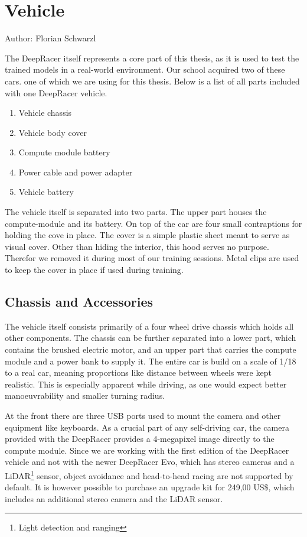 \chapter{Vehicle}
Author: Florian Schwarzl

The DeepRacer itself represents a core part of this thesis, as it is used to test the trained models in a real-world environment. Our school acquired two of these cars. one of which we are using for this thesis. Below is a list of all parts included with one DeepRacer vehicle.

\begin{enumerate}
    \item Vehicle chassis
    \item Vehicle body cover
    \item Compute module battery
    \item Power cable and power adapter
    \item Vehicle battery
\end{enumerate}

The vehicle itself is separated into two parts. The upper part houses the compute-module and its battery. On top of the car are four small contraptions for holding the cove in place. The cover is a simple plastic sheet meant to serve as visual cover. Other than hiding the interior, this hood serves no purpose. Therefor we removed it during most of our training sessions. Metal clips are used to keep the cover in place if used during training.

\section{Chassis and Accessories}
The vehicle itself consists primarily of a four wheel drive chassis which holds all other components. The chassis can be further separated into a lower part, which contains the brushed electric motor, and an upper part that carries the compute module and a power bank to supply it. The entire car is build on a scale of 1/18 to a real car, meaning proportions like distance between wheels were kept realistic. This is especially apparent while driving, as one would expect better manoeuvrability and smaller turning radius.

At the front there are three USB ports used to mount the camera and other equipment like keyboards. As a crucial part of any self-driving car, the camera provided with the DeepRacer provides a 4-megapixel image directly to the compute module. Since we are working with the first edition of the DeepRacer vehicle and not with the newer DeepRacer Evo, which has stereo cameras and a LiDAR\footnote{Light detection and ranging} sensor, object avoidance and head-to-head racing are not supported by default. It is however possible to purchase an upgrade kit for 249,00 US\$, which includes an additional stereo camera and the LiDAR sensor.

